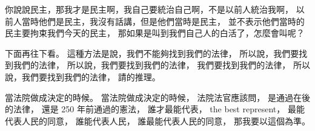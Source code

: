 \hypertarget{w02:cue:1955}{}你說說民主，那我才是民主啊，我自己要統治自己啊，不是以前人統治我啊，
\hypertarget{w02:cue:1956}{}以前人當時他們是民主，我沒有話講，但是他們當時是民主，
\hypertarget{w02:cue:1957}{}並不表示他們當時的民主要拘束我們今天的民主，
\hypertarget{w02:cue:1958}{}那如果是叫到我們自己人的白活了，怎麼會叫呢？

\hypertarget{w02:cue:1959}{}下面再往下看。
\hypertarget{w02:cue:1960}{}這種方法是說，我們不能夠找到我們的法律，
\hypertarget{w02:cue:1961}{}所以說，我們要找到我們的法律，
\hypertarget{w02:cue:1962}{}所以說，我們要找到我們的法律，
\hypertarget{w02:cue:1963}{}我們要找到我們的法律，
\hypertarget{w02:cue:1964}{}所以說，我們要找到我們的法律，
\hypertarget{w02:cue:1965}{}請的推理。

\hypertarget{w02:cue:1966}{}當法院做成決定的時候。
\hypertarget{w02:cue:1967}{}當法院做成決定的時候，
\hypertarget{w02:cue:1968}{}法院法官應該問，
\hypertarget{w02:cue:1969}{}是通過在後的法律，
\hypertarget{w02:cue:1970}{}還是 250 年前通過的憲法，
\hypertarget{w02:cue:1971}{}誰才最能代表，
\hypertarget{w02:cue:1972}{}the best represent，
\hypertarget{w02:cue:1973}{}最能代表人民的同意，
\hypertarget{w02:cue:1974}{}誰能代表人民，
\hypertarget{w02:cue:1975}{}誰最能代表人民的同意，
\hypertarget{w02:cue:1976}{}那我要以這個為準。

